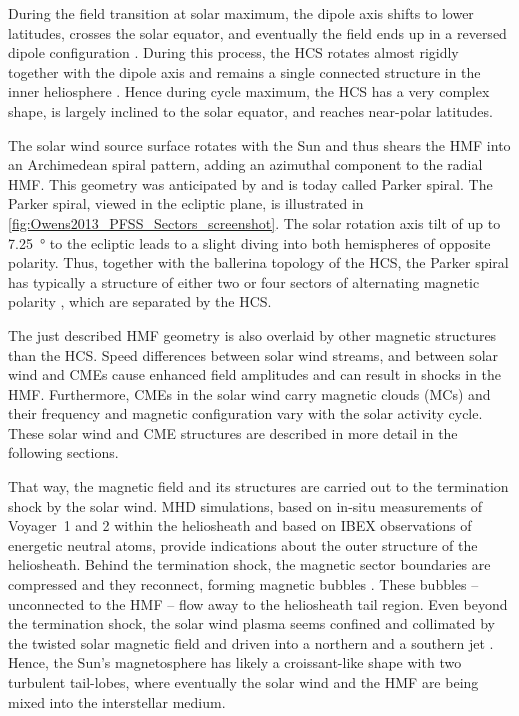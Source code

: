During the field transition at solar maximum, the dipole axis shifts to lower latitudes, crosses the solar equator, and eventually the field ends up in a reversed dipole configuration \citep{Jones2003}. During this process, the HCS rotates almost rigidly together with the dipole axis and remains a single connected structure in the inner heliosphere \citep{Jones2003}. Hence during cycle maximum, the HCS has a very complex shape, is largely inclined to the solar equator, and reaches near-polar latitudes.

The solar wind source surface rotates with the Sun and thus shears the HMF into an Archimedean spiral pattern, adding an azimuthal component to the radial HMF. This geometry was anticipated by \citet{Parker1958} and is today called Parker spiral. The Parker spiral, viewed in the ecliptic plane, is illustrated in \autoref{fig:Owens2013_PFSS_Sectors_screenshot}. The solar rotation axis tilt of up to \SI{7.25}{\degree} to the ecliptic leads to a slight diving into both hemispheres of opposite polarity. Thus, together with the ballerina topology of the HCS, the Parker spiral has typically a structure of either two or four sectors of alternating magnetic polarity \citep{Ness1965}, which are separated by the HCS.

The just described HMF geometry is also overlaid by other magnetic structures than the HCS. Speed differences between solar wind streams, and between solar wind and CMEs cause enhanced field amplitudes and can result in shocks in the HMF. Furthermore, CMEs in the solar wind carry magnetic clouds (MCs) and their frequency and magnetic configuration vary with the solar activity cycle. These solar wind and CME structures are described in more detail in the following sections.

That way, the magnetic field and its structures are carried out to the termination shock by the solar wind. MHD simulations, based on in-situ measurements of Voyager~1 and 2 within the heliosheath and based on IBEX observations of energetic neutral atoms, provide indications about the outer structure of the heliosheath. Behind the termination shock, the magnetic sector boundaries are compressed and they reconnect, forming magnetic bubbles \citep{Opher2011}. These bubbles -- unconnected to the HMF -- flow away to the heliosheath tail region. Even beyond the termination shock, the solar wind plasma seems confined and collimated by the twisted solar magnetic field and driven into a northern and a southern jet \citep{Opher2015}. Hence, the Sun's magnetosphere has likely a croissant-like shape with two turbulent tail-lobes, where eventually the solar wind and the HMF are being mixed into the interstellar medium.

